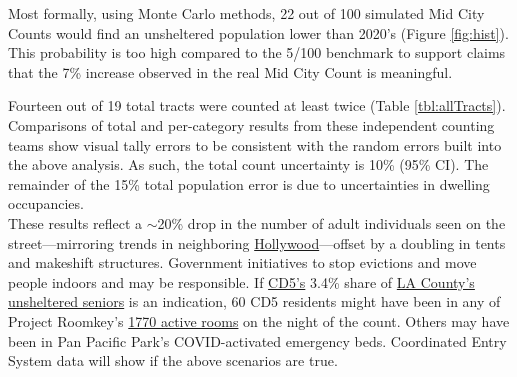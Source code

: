 \documentclass[11pt]{article}
\begin{document}
Most formally, using Monte Carlo methods, 22 out of 100 simulated Mid City Counts would find an 
unsheltered population lower than 2020's (Figure \ref{fig:hist}). This probability is too high compared to 
the 5/100 benchmark to support claims that the 7\% increase observed in the real Mid City Count is
meaningful.


Fourteen out of 19 total tracts were counted at least twice (Table \ref{tbl:allTracts}). 
Comparisons of total and per-category results from these independent counting teams
show visual tally errors to be consistent with the random errors built into the above analysis. 
As such, the total count uncertainty is 10\% (95\% CI). The remainder of the 15\% total 
population error is due to uncertainties in dwelling occupancies.\\

 These results reflect a $\sim$20\% drop in the number
of adult individuals seen on the street---mirroring trends in neighboring 
\href{https://www.latimes.com/homeless-housing/story/2021-04-13/despite-appearances-15-fewer-homeless-people-were-on-hollywood-streets-this-year}{Hollywood}---offset by a doubling in tents and 
makeshift structures. Government initiatives to stop evictions and move people indoors and may be 
responsible. If \href{https://www.lahsa.org/documents?id=4664-2020-homeless-count-council-district-5}{CD5's} 3.4\% share of \href{https://www.lahsa.org/documents?id=4585-2020-greater-los-angeles-homeless-count-los-angeles-continuum-of-care-coc-}{LA County's unsheltered seniors} 
is an indication, 60 CD5 residents might have been in any of Project Roomkey's 
\href{https://projectroomkeytracker.com/}{1770 active rooms} on the night of the count. Others
may have been in Pan Pacific Park's COVID-activated emergency beds. Coordinated Entry System data 
will show if the above scenarios are true.
\end{document}
